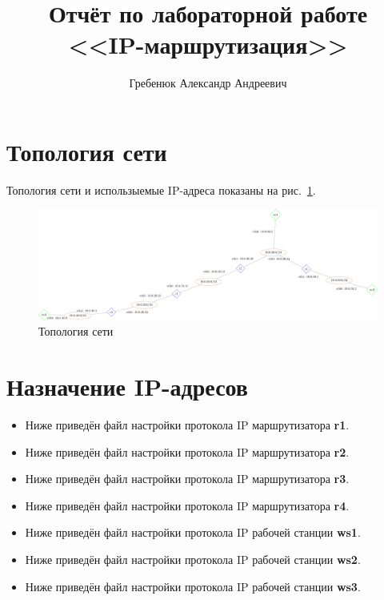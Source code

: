 \documentclass[a4paper,12pt]{article}
\title{Отчёт по лабораторной работе \\ <<IP-маршрутизация>>}
\author{Гребенюк Александр Андреевич}
\begin{document}
\maketitle

\tableofcontents

\clearpage


\section{Топология сети}

Топология сети и использыемые IP-адреса показаны на рис.~\ref{fig:network}.

\begin{figure}[h]
\centering
\includegraphics[width=\textwidth]{includes/network_gv.pdf}
\caption{Топология сети}
\label{fig:network}
\end{figure}


\section{Назначение IP-адресов}
\begin{itemize}
\item Ниже приведён файл настройки протокола IP маршрутизатора \textbf{r1}.

\item Ниже приведён файл настройки протокола IP маршрутизатора \textbf{r2}.

\item Ниже приведён файл настройки протокола IP маршрутизатора \textbf{r3}.

\item Ниже приведён файл настройки протокола IP маршрутизатора \textbf{r4}.


\item Ниже приведён файл настройки протокола IP рабочей станции \textbf{ws1}.

\item Ниже приведён файл настройки протокола IP рабочей станции \textbf{ws2}.

\item Ниже приведён файл настройки протокола IP рабочей станции \textbf{ws3}.

\end{itemize}
\end{document}
